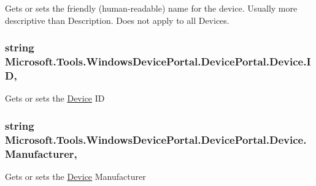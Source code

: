 Gets or sets the friendly (human-\/readable) name for the device. Usually more descriptive than Description. Does not apply to all Devices. 

\subsubsection[{\texorpdfstring{ID}{ID}}]{\setlength{\rightskip}{0pt plus 5cm}string Microsoft.\+Tools.\+Windows\+Device\+Portal.\+Device\+Portal.\+Device.\+ID\hspace{0.3cm}{\ttfamily [get]}, {\ttfamily [set]}}\hypertarget{class_microsoft_1_1_tools_1_1_windows_device_portal_1_1_device_portal_1_1_device_a71a738dd2f311bfa6e4c1de9f1026977}{}\label{class_microsoft_1_1_tools_1_1_windows_device_portal_1_1_device_portal_1_1_device_a71a738dd2f311bfa6e4c1de9f1026977}


Gets or sets the \hyperlink{class_microsoft_1_1_tools_1_1_windows_device_portal_1_1_device_portal_1_1_device}{Device} ID 

\subsubsection[{\texorpdfstring{Manufacturer}{Manufacturer}}]{\setlength{\rightskip}{0pt plus 5cm}string Microsoft.\+Tools.\+Windows\+Device\+Portal.\+Device\+Portal.\+Device.\+Manufacturer\hspace{0.3cm}{\ttfamily [get]}, {\ttfamily [set]}}\hypertarget{class_microsoft_1_1_tools_1_1_windows_device_portal_1_1_device_portal_1_1_device_a1d15a5277f5e286e269c46d3ff3e39e6}{}\label{class_microsoft_1_1_tools_1_1_windows_device_portal_1_1_device_portal_1_1_device_a1d15a5277f5e286e269c46d3ff3e39e6}


Gets or sets the \hyperlink{class_microsoft_1_1_tools_1_1_windows_device_portal_1_1_device_portal_1_1_device}{Device} Manufacturer 

